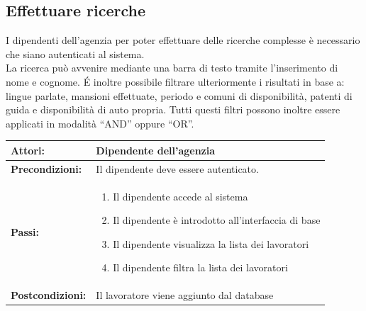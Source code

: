 \documentclass[a4paper, oneside, 12pt]{article}
\begin{document}
\newpage

\subsection{Effettuare ricerche}
I dipendenti dell'agenzia per poter effettuare delle ricerche complesse è necessario che siano autenticati al sistema. \\
La ricerca può avvenire mediante una barra di testo tramite l'inserimento di nome e cognome.
\'E inoltre possibile filtrare ulteriormente i risultati in base a: lingue parlate, mansioni effettuate, periodo e comuni di disponibilità,
patenti di guida e disponibilità di auto propria. Tutti questi filtri possono inoltre essere applicati in modalità “AND” oppure “OR”. \\

\begin{tabular}{ | l | p{11cm} | } 
	\hline
	\textbf{Attori:} & Dipendente dell'agenzia  \\ 
	\hline
	\textbf{Precondizioni:} & Il dipendente deve essere autenticato. \\
	\hline
	\textbf{Passi:} &
		\begin{enumerate}
			\item Il dipendente accede al sistema
			\item Il dipendente è introdotto all'interfaccia di base
			\item Il dipendente visualizza la lista dei lavoratori
			\item Il dipendente filtra la lista dei lavoratori
		\end{enumerate} \\
	\hline
	\textbf{Postcondizioni:} &  Il lavoratore viene aggiunto dal database \\
	\hline
  \end{tabular}


\end{document}
